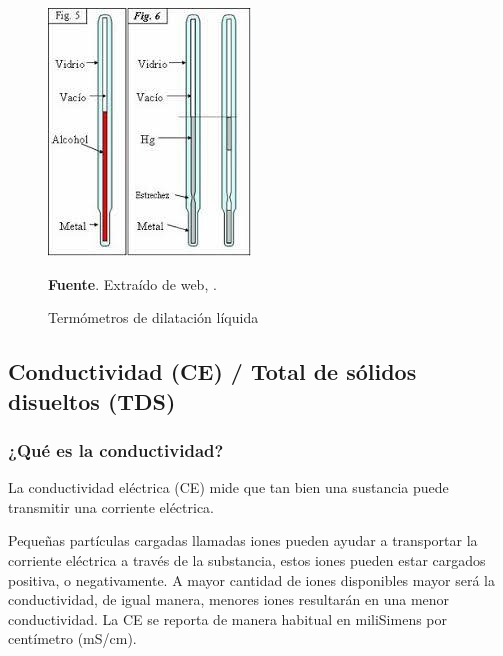 \begin{itemize}
    \begin{figure}[ht]
        \centering
        \includegraphics[width=0.8\linewidth]{Imagenes/cap2/Dilatacion Liquida.jpg}\\
        \bigskip
        \caption { Term\'ometros de dilataci\'on l\'iquida  } \textbf{Fuente}. Extra\'ido de web, \cite{equipos_y_laboratorio_de_colombia_termometros_nodate}.
        \label{fig:dilatacion_li}
    \end{figure}
\end{itemize}

\subsection{Conductividad (CE) / Total de sólidos disueltos (TDS)}
\subsubsection{¿Qué es la conductividad?}
La conductividad eléctrica (CE) mide que tan bien una sustancia puede transmitir una corriente eléctrica. 

Pequeñas partículas cargadas llamadas iones pueden ayudar a transportar la corriente eléctrica a través de la substancia, estos iones pueden estar cargados positiva, o negativamente. A mayor cantidad de iones disponibles mayor será la conductividad, de igual manera, menores iones resultarán en una menor conductividad. La CE se reporta de manera habitual en miliSimens por centímetro (mS/cm).

